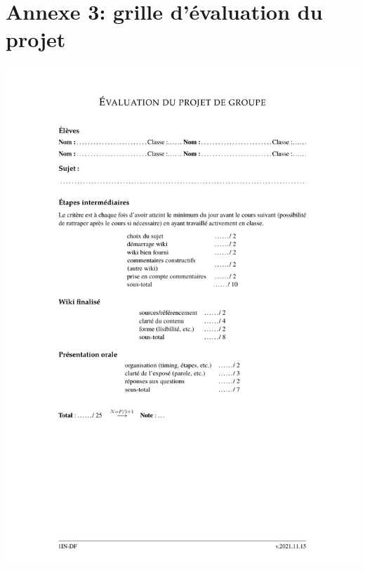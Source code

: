 \documentclass[11pt,bibliography=totoc]{scrartcl}
\begin{document}
\section*{Annexe 3: grille d'évaluation du projet} %
\includegraphics[width=.95\textwidth]{evaluation.pdf}
\end{document}
